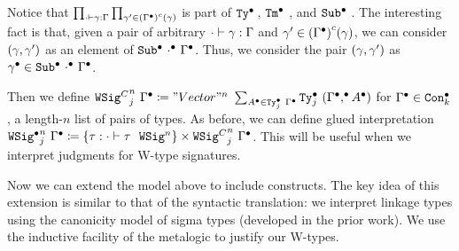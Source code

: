 Notice that
$\prod_{ {\cdot} \vdash {\ensuremath{\gamma}} : {\Gamma} } \prod_{\gamma' \in {({\ensuremath{{\Gamma}^\bullet}})}^c(\gamma)}$
is part of ${\texttt{Ty}}^\bullet_{\!}~{\!}$, ${\texttt{Tm}}^\bullet~{\!}~{\!}$, and ${\texttt{Sub}}^\bullet~{\!}~{\!}$.
The interesting fact is that, given a pair of arbitrary $ {\cdot} \vdash {\ensuremath{\gamma}} : {\Gamma} $
and $\gamma' \in {({\ensuremath{{\Gamma}^\bullet}})}^c(\gamma)$, we can consider $(\gamma, \gamma')$ as an
element of ${\texttt{Sub}}^\bullet~{{\cdot}^\bullet}~{{\Gamma}^\bullet}$.
Thus, we consider the pair $(\gamma,
\gamma')$ as ${\gamma}^\bullet \in {\texttt{Sub}}^\bullet~{{\cdot}^\bullet}~{{\Gamma}^\bullet}$.


Then we define ${\texttt{WSig}^C}_{j}^{n}~{{\Gamma}^\bullet} \coloneq "Vector"^n~\sum_{{A}^\bullet
\in {\texttt{Ty}}^\bullet_{j}~{{\Gamma}^\bullet}} {\texttt{Ty}}^\bullet_{j}~{({{\Gamma}^\bullet},^\bullet{\ensuremath{{A}^\bullet}})}$ for
${\Gamma}^\bullet \in {\texttt{Con}}^\bullet_{k}$, a length-$n$ list of pairs of types.
As before, we can define glued interpretation ${{\texttt{WSig}}^\bullet}_{j}^{n}~{{\Gamma}^\bullet}
\coloneq \{ \tau :  {\cdot} \vdash {\ensuremath{\tau}} \ \ \texttt{WSig}^{n}  \} \times
{\texttt{WSig}^C}_{j}^{n}~{{\Gamma}^\bullet}$. This will be useful when we interpret judgments for
W-type signatures.


Now we can extend the model above to include \TT constructs.
The key idea of this extension is similar to that of the syntactic translation:
we interpret linkage types using the canonicity model of sigma types (developed in the prior work).
We use the inductive facility of the meta\-logic to justify our W-types.

\newcommand{\CWmodel}{\ensuremath{\mathit{W}^C}}
\newcommand{\CWsup}{\ensuremath{\mathit{W^Csup}}}
\newcommand{\CWrec}{\ensuremath{\mathit{W^Crec}}}

